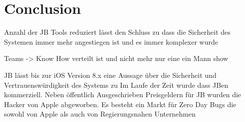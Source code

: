 %
%
%
% 


\chapter{Conclusion}
\label{ch:Conclusion}



Anzahl der JB Tools reduziert lässt den Schluss zu dass die Sicherheit des Systemen immer mehr angestiegen ist und es immer komplexer wurde 

Teams -> Know How verteilt ist und nicht mehr nur eine ein Mann show

JB lässt bis zur iOS Version 8.x eine Aussage über die Sicherheit und Vertrauenswürdigkeit des Systems zu
Im Laufe der Zeit wurde dass JBen kommerziell. Neben öffentlich Ausgeschrieben Preisgeldern für JB wurden die Hacker von Apple abgeworben. Es besteht ein Markt für Zero Day Bugs die sowohl von Apple als auch von Regierungsnahen Unternehmen 


